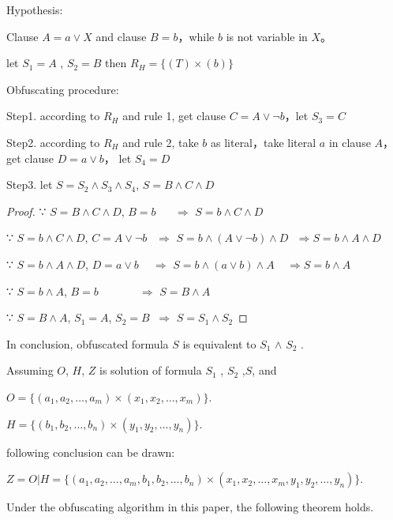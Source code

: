 \documentclass[runningheads,a4paper]{llncs}
\begin{document}
\noindent Hypothesis: 

\noindent Clause $A=a\vee X$ and clause $B=b$，while $b$ is not variable in $X$。

\noindent let $S_1=A$ , $S_2=B$  then $R_H=\{(T)\times(b)\}$ 

\noindent Obfuscating procedure:

Step1. according to $R_H$ and rule 1, get clause $C=A\vee \neg b$，let $S_3=C$

Step2. according to $R_H$ and rule 2, take $b$ as literal，take literal $a$ in clause $A$，get clause $D=a\vee b$， let $S_4=D$

Step3. let $S=S_2 \wedge S_3\wedge S_4$, $S=B\wedge C\wedge D$


\begin{proof}

∵ $S=B\wedge C\wedge D$, $B=b$ $~~~~~~\Longrightarrow$ $S=b\wedge C\wedge D$

∵ $S=b\wedge C\wedge D$, $C=A\vee \neg b$ $~~\Longrightarrow$ $S=b\wedge (A\vee \neg b)\wedge D ~~~\Longrightarrow S=b\wedge A\wedge D$

∵ $S=b\wedge A\wedge D$,  $D=a\vee b$  $~~~~\Longrightarrow$ $S=b\wedge (a\vee b)\wedge A ~~~~~\Longrightarrow S=b\wedge A$

∵ $S=b\wedge A$, $B=b$  $~~~~~~~~~~~~~~~\Longrightarrow$ $S= B\wedge A$ 

∵ $S=B\wedge A$,    $S_1=A$,  $S_2=B$   $~\Longrightarrow$ $S= S_1\wedge S_2$ 
\end{proof}

In conclusion, obfuscated formula $S$ is equivalent to $S_1$ $\wedge$  $S_2$ .

Assuming $O$, $H$, $Z$ is solution of formula $S_1$ , $S_2$ ,$S$, and

$O=\{(a_1,a_2,\dots,a_m)\times(x_1,x_2,\dots,x_m)\}$. 

$H=\{(b_1,b_2,\dots,b_n)\times(y_1,y_2,\dots,y_n)\}$. 


following conclusion can be drawn:

$Z=O|H=\{(a_1,a_2,\dots,a_m,b_1,b_2,\dots,b_n)\times(x_1,x_2,\dots,x_m,y_1,y_2,\dots,y_n)\}$.

Under the obfuscating algorithm in this paper, the following theorem holds.

\end{document}

